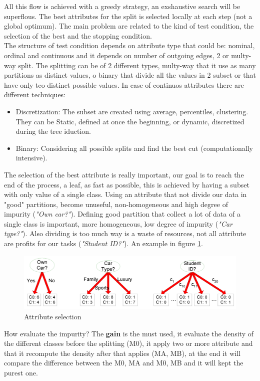 \documentclass[12pt]{article}
\begin{document}
All this flow is achieved with a greedy strategy, an exshaustive search will be superflous. The best attributes for the split is selected locally at each step (not a global optimum). The main problem are related to the kind of test condition, the selection of the best and the stopping condition.\\
The structure of test condition depends on attribute type that could be: nominal, ordinal and continuous and it depends on number of outgoing edges, 2 or multy-way split. The splitting can be of 2 different types, multy-way that it use as many partitions as distinct values, o binary that divide all the values in 2 subset or that have only teo distinct possible values. In case of continuos attributes there are different techniques:
\begin{itemize}
  \item Discretization: The subset are created using average, percentiles, clustering. They can be Static, defined at once the beginning, or dynamic, discretized during the tree iduction.
  \item Binary: Considering all possible splits and find the best cut (computationally intensive).
\end{itemize}
The selection of the best attribute is really important, our goal is to reach the end of the process, a leaf, as fast as possible, this is achieved by having a subset with only value of a single class. Using an attribute that not divide our data in "good" partitions, become unuseful, non-homogeneous and high degree of impurity (\textit{"Own car?"}). Defining good partition that collect a lot of data of a single class is important, more homogeneous, low degree of impurity (\textit{"Car type?"}). Also dividing is too much way is a waste of resources, not all attribute are profits for our tasks (\textit{"Student ID?"}). An example in figure \ref{fig:attr_sel}.
\begin{figure}[H]
  \includegraphics[width=\linewidth]{images/attr_sel.png}
  \caption{Attribute selection}
  \label{fig:attr_sel}
\end{figure}
How evaluate the impurity? The \textbf{gain} is the must used, it evaluate the density of the different classes before the splitting (M0), it apply two or more attribute and that it recompute the density after that applies (MA, MB), at the end it will compare the difference between the M0, MA and M0, MB and it will kept the purest one.\\
\end{document}
